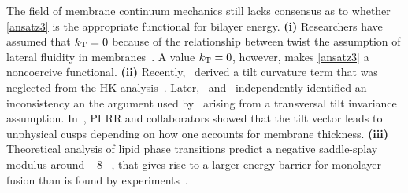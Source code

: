 
The field of membrane continuum mechanics still lacks consensus as to whether \eqref{ansatz3} is the appropriate functional for bilayer energy.
\textbf{(i)} Researchers have assumed that $k_{\mathrm{T}} = 0$ because of the
relationship between twist the assumption of lateral fluidity in
membranes~\cite{Hamm2000, TerziDeserno17, C9SM02079A,
PhysRevE.102.042406}. 
A value $k_{\mathrm{T}} = 0$, however, makes \eqref{ansatz3} a noncoercive functional.
\textbf{(ii)} Recently,~\cite{TerziDeserno17} derived a tilt curvature
term that was neglected from the HK analysis~\cite{Hamm2000}.
Later,~\cite{C9SM02079A} and~\cite{PhysRevE.102.042406} independently
identified an inconsistency an the argument used
by~\cite{TerziDeserno17} arising
from a transversal tilt invariance assumption.
In~\cite{RyKlYaCo16}, PI RR and collaborators showed that the tilt vector leads to unphysical cusps depending on how one accounts for membrane thickness.  
\textbf{(iii)} Theoretical analysis of lipid phase transitions predict a
negative saddle-splay modulus around $-8$ \kBT~\cite{SIEGEL2004366,
SIEGEL20085200}, that gives rise to a larger energy barrier for
monolayer fusion than is found by experiments~\cite{FrRoPi17, Tran7106,
TerziDeserno17}.
%
%

